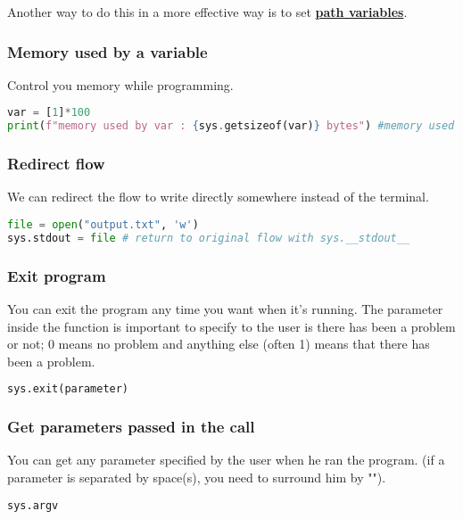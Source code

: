 \documentclass[a4paper, 12pt, titlepage]{scrartcl} %
\begin{document}
Another way to do this in a more effective way is to set \hyperref[subsec:PathVariables]{\textbf{path variables}}.

\subsubsection{Memory used by a variable}
Control you memory while programming. 
\begin{lstlisting}[language=Python]
var = [1]*100
print(f"memory used by var : {sys.getsizeof(var)} bytes") #memory used by var : 856 bytes
\end{lstlisting} \vspace{5mm}

\subsubsection{Redirect flow}
We can redirect the flow to write directly somewhere instead of the terminal.
\begin{lstlisting}[language=Python]
file = open("output.txt", 'w')
sys.stdout = file # return to original flow with sys.__stdout__
\end{lstlisting} \vspace{5mm}

\subsubsection{Exit program}
You can exit the program any time you want when it's running. The parameter inside the function is important to specify to the user is there has been a problem or not; 0 means no problem and anything else (often 1) means that there has been a problem.
\begin{lstlisting}[language=Python]
sys.exit(parameter)
\end{lstlisting} \vspace{5mm}

\subsubsection{Get parameters passed in the call}
You can get any parameter specified by the user when he ran the program. (if a parameter is separated by space(s), you need to surround him by "").
\begin{lstlisting}[language=Python]
sys.argv
\end{lstlisting} \vspace{5mm}
\end{document}
